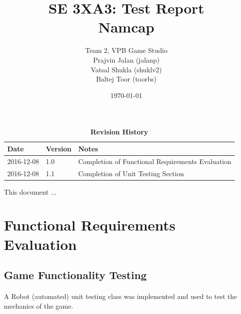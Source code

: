 \documentclass[12pt, titlepage]{article}
\title{SE 3XA3: Test Report\\Namcap}
\author{Team 2, VPB Game Studio
		\\ Prajvin Jalan (jalanp)
		\\ Vatsal Shukla (shuklv2)
		\\ Baltej Toor (toorbs)
}
\date{\today}
\begin{document}
\maketitle

\tableofcontents
\listoftables
\listoffigures

\begin{table}[bp]
\caption{\bf Revision History}
\begin{tabularx}{\textwidth}{p{3cm}p{2cm}X}
\toprule {\bf Date} & {\bf Version} & {\bf Notes}\\
\midrule
2016-12-08 & 1.0 & Completion of Functional Requirements Evaluation\\
2016-12-08 & 1.1 & Completion of Unit Testing Section\\
\bottomrule
\end{tabularx}
\end{table}

\newpage


This document ...

\section{Functional Requirements Evaluation}

\subsection{Game Functionality Testing}

\paragraph{}
A Robot (automated) unit testing class was implemented and used to test the mechanics of the game.
\end{document}
